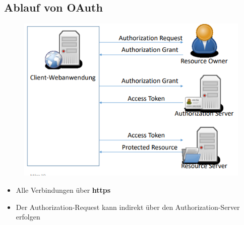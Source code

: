 \subsection{Ablauf von OAuth}
\begin{figure}[H]
	\begin{center}
		\includegraphics[scale=0.8]{Resources/OAuth}
		\caption{}
		\label{fig:OAuth}
	\end{center}
\end{figure}
\begin{itemize}
	\item Alle Verbindungen über \textbf{https}
	\item Der Authorization-Request kann indirekt über den Authorization-Server erfolgen
\end{itemize}

